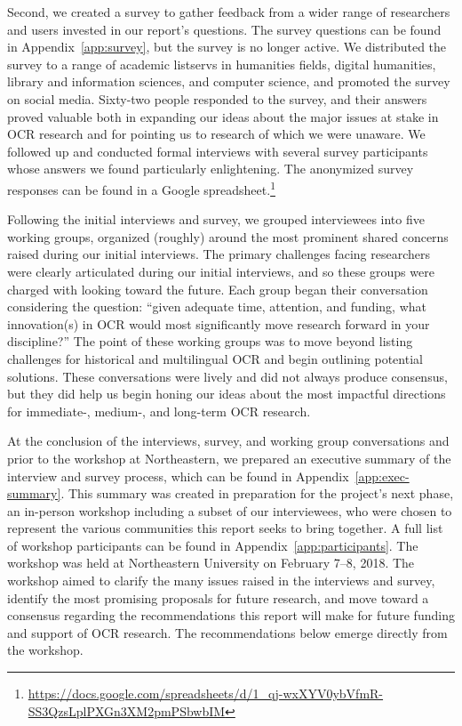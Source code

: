 \documentclass[twoside,11pt]{report}
\begin{document}
Second, we created a survey to gather feedback from a wider range of researchers and users invested in our report's questions. The survey questions can be found in Appendix~\ref{app:survey}, but the survey is no longer active. We distributed the survey to a range of academic listservs in humanities fields, digital humanities, library and information sciences, and computer science, and promoted  the survey on social media. Sixty-two people responded to the survey, and their answers proved valuable both in expanding our ideas about the major issues at stake in OCR research and for pointing us to research of which we were unaware. We followed up and conducted formal interviews with several survey participants whose answers we found particularly enlightening.  The anonymized survey responses can be found in a Google spreadsheet.\footnote{\url{https://docs.google.com/spreadsheets/d/1_qj-wxXYV0ybVfmR-SS3QzsLplPXGn3XM2pmPSbwbIM}}

Following the initial interviews and survey, we grouped interviewees into five working groups, organized (roughly) around the most prominent shared concerns raised during our initial interviews. The primary challenges facing researchers were clearly articulated during our initial interviews, and so these groups were charged with looking toward the future. Each group began their conversation considering the question: ``given adequate time, attention, and funding, what innovation(s) in OCR would most significantly move research forward in your discipline?''  The point of these working groups was to move beyond listing challenges for historical and multilingual OCR and begin outlining potential solutions. These conversations were lively and did not always produce consensus, but they did help us begin honing our ideas about the most impactful directions for immediate-, medium-, and long-term OCR research.

At the conclusion of the interviews, survey, and working group conversations and prior to the workshop at Northeastern, we prepared an executive summary of the interview and survey process, which can be found in Appendix~\ref{app:exec-summary}. This summary was created in preparation for the project's next phase, an in-person workshop including a subset of our interviewees, who were chosen to represent the various communities this report seeks to bring together. A full list of workshop participants can be found in Appendix~\ref{app:participants}.  The workshop was held at Northeastern University on February 7--8, 2018. The workshop aimed to clarify the many issues raised in the interviews and survey, identify the most promising proposals for future research, and move toward a consensus regarding the recommendations this report will make for future funding and support of OCR research. The recommendations below emerge directly from the workshop.
\end{document}
